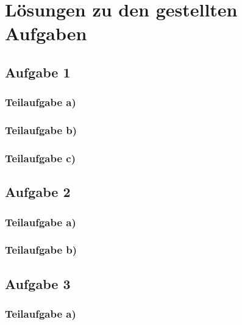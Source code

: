 \documentclass{llncs}
\begin{document}
\chapter*{L\"osungen zu den gestellten Aufgaben}

\section*{Aufgabe 1}

\subsection*{Teilaufgabe a)}
\subsection*{Teilaufgabe b)}
\subsection*{Teilaufgabe c)}

\section*{Aufgabe 2}
\subsection*{Teilaufgabe a)}
\subsection*{Teilaufgabe b)}


\section*{Aufgabe 3}

\subsection*{Teilaufgabe a)}
\end{document}
